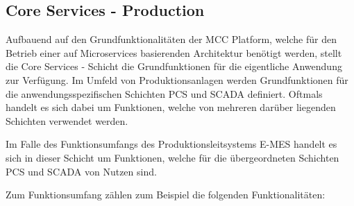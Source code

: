 \subsection{Core Services - Production\label{subsec3.1.2:Unterunterpunkt-2}}

Aufbauend auf den Grundfunktionalitäten der \glqq MCC Platform\grqq{}, welche für den Betrieb einer auf Microservices basierenden Architektur benötigt werden, stellt die \glqq Core Services\grqq{} - Schicht die Grundfunktionen für die eigentliche Anwendung zur Verfügung. Im Umfeld von Produktionsanlagen werden Grundfunktionen für die anwendungsspezifischen Schichten \glqq PCS\grqq{} und \glqq SCADA\grqq{} definiert. Oftmals handelt es sich dabei um Funktionen, welche von mehreren darüber liegenden Schichten verwendet werden.

Im Falle des Funktionsumfangs des Produktionsleitsystems \glqq E-MES\grqq{} handelt es sich in dieser Schicht um Funktionen, welche für die übergeordneten Schichten \glqq PCS\grqq{} und \glqq SCADA\grqq{} von Nutzen sind.

Zum Funktionsumfang zählen zum Beispiel die folgenden Funktionalitäten:

